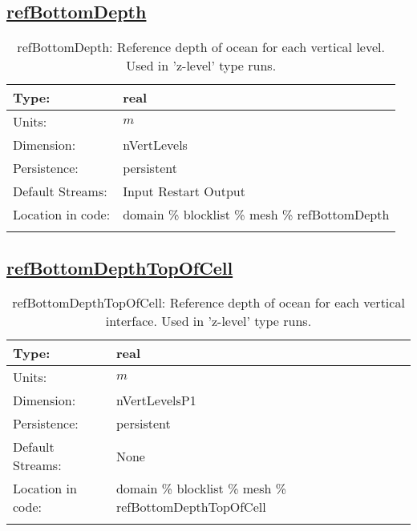 \subsection[refBottomDepth]{\hyperref[sec:var_tab_mesh]{refBottomDepth}}
\label{subsec:var_sec_mesh_refBottomDepth}
\begin{center}
\begin{longtable}{| p{2.0in} | p{4.0in} |}
        \hline 
        Type: & real \\
        \hline 
        Units: & $m$ \\
        \hline 
        Dimension: & nVertLevels \\
        \hline 
        Persistence: & persistent \\
        \hline 
		 Default Streams: & Input Restart Output  \\
        \hline 
		 Location in code: & domain \% blocklist \% mesh \% refBottomDepth \\
		 \hline 
    \caption{refBottomDepth: Reference depth of ocean for each vertical level. Used in 'z-level' type runs.}
\end{longtable}
\end{center}
\subsection[refBottomDepthTopOfCell]{\hyperref[sec:var_tab_mesh]{refBottomDepthTopOfCell}}
\label{subsec:var_sec_mesh_refBottomDepthTopOfCell}
\begin{center}
\begin{longtable}{| p{2.0in} | p{4.0in} |}
        \hline 
        Type: & real \\
        \hline 
        Units: & $m$ \\
        \hline 
        Dimension: & nVertLevelsP1 \\
        \hline 
        Persistence: & persistent \\
        \hline 
		 Default Streams: & None \\
        \hline 
		 Location in code: & domain \% blocklist \% mesh \% refBottomDepthTopOfCell \\
		 \hline 
    \caption{refBottomDepthTopOfCell: Reference depth of ocean for each vertical interface. Used in 'z-level' type runs.}
\end{longtable}
\end{center}
